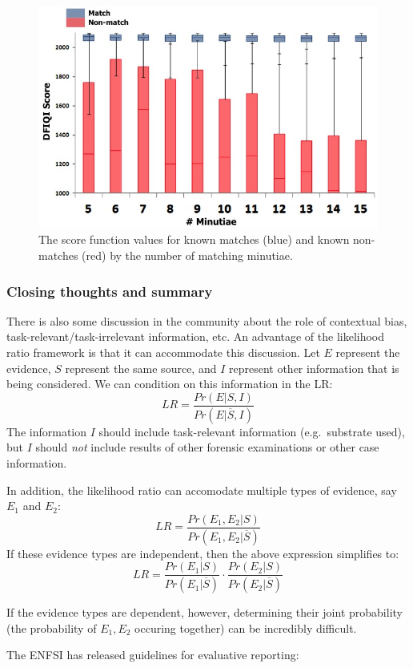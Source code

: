 \documentclass[]{book}
\theoremstyle{definition}
\theoremstyle{definition}
\theoremstyle{remark}
\begin{document}
\begin{figure}

{\centering \includegraphics[width=.5\linewidth]{img/dfscscore} 

}

\caption{The score function values for known matches (blue) and known non-matches (red) by the number of matching minutiae.}\label{fig:minutiae}
\end{figure}

\subsubsection{Closing thoughts and
summary}\label{closing-thoughts-and-summary}

There is also some discussion in the community about the role of
contextual bias, task-relevant/task-irrelevant information, etc. An
advantage of the likelihood ratio framework is that it can accommodate
this discussion. Let \(E\) represent the evidence, \(S\) represent the
same source, and \(I\) represent other information that is being
considered. We can condition on this information in the LR:
\[LR = \frac{Pr(E|S,I)}{Pr(E|\overline{S},I)}\] The information \(I\)
should include task-relevant information (e.g.~substrate used), but
\(I\) should \emph{not} include results of other forensic examinations
or other case information.

In addition, the likelihood ratio can accomodate multiple types of
evidence, say \(E_1\) and \(E_2\):
\[LR = \frac{Pr(E_1,E_2|S)}{Pr(E_1, E_2|\overline{S})}\] If these
evidence types are independent, then the above expression simplifies to:
\[LR = \frac{Pr(E_1|S)}{Pr(E_1|\overline{S})}\cdot \frac{Pr(E_2|S)}{Pr(E_2|\overline{S})}\]

If the evidence types are dependent, however, determining their joint
probability (the probability of \(E_1,E_2\) occuring together) can be
incredibly difficult.

The ENFSI has released guidelines for evaluative reporting:
\end{document}
